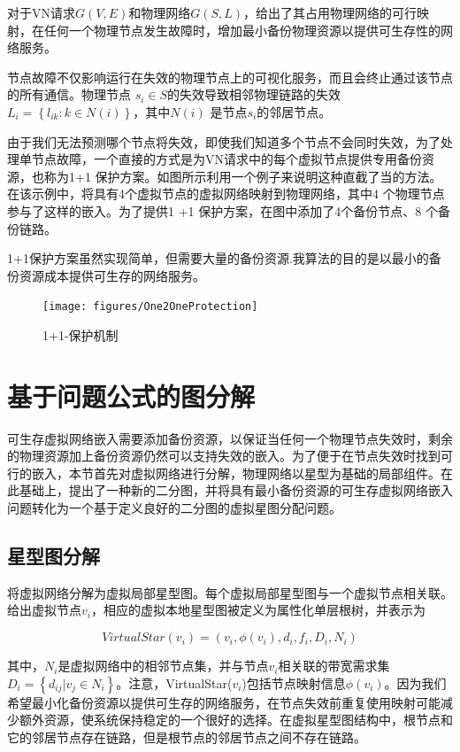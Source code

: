 对于VN请求$G (V,E)$和物理网络$G (S,L)$，给出了其占用物理网络的可行映射，在任何一个物理节点发生故障时，增加最小备份物理资源以提供可生存性的网络服务。

节点故障不仅影响运行在失效的物理节点上的可视化服务，而且会终止通过该节点的所有通信。物理节点 $ {s_i} \in S $的失效导致相邻物理链路的失效${L_i} = \left\{ {{l_{ik}}:k \in N(i)} \right\}$，其中${N(i)}$ 是节点$ {s_i} $的邻居节点。

由于我们无法预测哪个节点将失效，即使我们知道多个节点不会同时失效，为了处理单节点故障，一个直接的方式是为VN请求中的每个虚拟节点提供专用备份资源，也称为1+1 保护方案。如图\cite{fig:One2OneProtection}所示利用一个例子来说明这种直截了当的方法。在该示例中，将具有4个虚拟节点的虚拟网络映射到物理网络，其中4 个物理节点参与了这样的嵌入。为了提供1 +1 保护方案，在图中添加了4个备份节点、8 个备份链路。

1+1保护方案虽然实现简单，但需要大量的备份资源.我算法的目的是以最小的备份资源成本提供可生存的网络服务。

\begin{figure}
\centering
\texttt{[image: figures/One2OneProtection]}\\
\caption{1+1-保护机制}\label{fig:One2OneProtection}
\end{figure}
\section{基于问题公式的图分解}
可生存虚拟网络嵌入需要添加备份资源，以保证当任何一个物理节点失效时，剩余的物理资源加上备份资源仍然可以支持失效的嵌入。为了便于在节点失效时找到可行的嵌入，本节首先对虚拟网络进行分解，物理网络以星型为基础的局部组件。在此基础上，提出了一种新的二分图，并将具有最小备份资源的可生存虚拟网络嵌入问题转化为一个基于定义良好的二分图的虚拟星图分配问题。
\subsection{星型图分解}
将虚拟网络分解为虚拟局部星型图。每个虚拟局部星型图与一个虚拟节点相关联。给出虚拟节点$v_i$，相应的虚拟本地星型图被定义为属性化单层根树，并表示为

\begin{equation}
VirtualStar(v_i)=(v_i, \phi(v_i), d_i, f_i, D_i, N_i)
\label{eq:virtualstar}
\end{equation}


其中，$N_i$是虚拟网络中的相邻节点集，并与节点$v_i$相关联的带宽需求集${D_i} = \left\{ {{d_{ij}}|{v_j} \in {N_i}} \right\} $。注意，VirtualStar($v_i$)包括节点映射信息$\phi(v_i)$。因为我们希望最小化备份资源以提供可生存的网络服务，在节点失效前重复使用映射可能减少额外资源，使系统保持稳定的一个很好的选择。在虚拟星型图结构中，根节点和它的邻居节点存在链路，但是根节点的邻居节点之间不存在链路。

